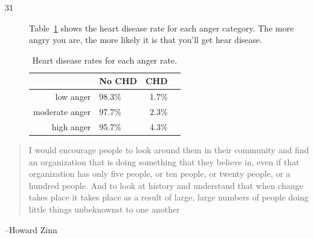 \documentclass[letterpaper, landscape]{exam}
\begin{document}
\begin{description}
    \item[31]
      Table~\ref{tab:ex31} shows the heart disease rate for each anger category.
      The more angry you are, the more likely it is that you'll get hear
      disease.

      \begin{table}[H]
        \centering
        \begin{tabular}{rlrr}
          \toprule
                         & No CHD   & CHD \\
          \midrule
          low anger      & 98.3\%   & 1.7\% \\
          moderate anger & 97.7\%   & 2.3\% \\
          high anger     & 95.7\%   & 4.3\% \\
          \bottomrule
        \end{tabular}
        \caption{Heart disease rates for each anger rate.}\label{tab:ex31}
      \end{table}

  \end{description}

  \else
    \vspace{10 cm}
    \begin{quote}
      \begin{em}
        I would encourage people to look around them in their community and find an
        organization that is doing something that they believe in, even if that
        organization has only five people, or ten people, or twenty people, or a hundred
        people. And to look at history and understand that when change takes place it
        takes place as a result of large, large numbers of people doing little things
        unbeknownst to one another
      \end{em}
    \end{quote}
    \hspace{1 cm} --Howard Zinn
  \fi
\end{document}

